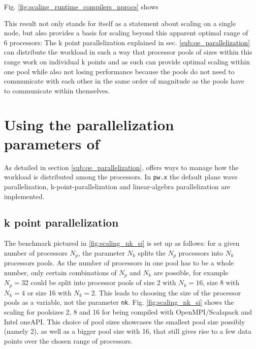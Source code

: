 \documentclass[main.tex]{subfiles}
\begin{document}

Fig. \ref{fig:scaling_runtime_compilers_nprocs} shows 



This result not only stands for itself as a statement about scaling on a single node, but also provides a basis for scaling beyond this apparent optimal range of 6 processors:
The k point parallelization explained in sec. \ref{sub:qe_parallelization} can distribute the workload in such a way that processor pools of sizes within this range work on individual k points and as such can provide optimal scaling within one pool while also not losing performance because the pools do not need to communicate with each other in the same order of magnitude as the pools have to communicate within themselves.


\section{Using the parallelization parameters of \QE}

As detailed in section \ref{sub:qe_parallelization}, \QE offers ways to manage how the workload is distributed among the processors.
In \texttt{pw.x} the default plane wave parallelization, k-point-parallelization and linear-algebra parallelization are implemented.

\subsection{k point parallelization}

The benchmark pictured in \ref{fig:scaling_nk_si} is set up as follows: for a given number of processors \(N_p\), the parameter \(N_k\) splits the \(N_p\) processors into \(N_k\) processors pools.
As the number of processors in one pool has to be a whole number, only certain combinations of \(N_p\) and \(N_k\) are possible, for example \(N_p = 32\) could be split into processor pools of size 2 with \(N_k = 16\), size 8 with \(N_k = 4\) or size 16 with \(N_k = 2\).
This leads to choosing the size of the processor pools as a variable, not the parameter \texttt{nk}.
Fig. \ref{fig:scaling_nk_si} shows the scaling for poolsizes 2, 8 and 16 for \QE being compiled with OpenMPI/Scalapack and Intel oneAPI.
This choice of pool sizes showcases the smallest pool size possibly (namely 2), as well as a bigger pool size with 16, that still gives rise to a few data points over the chosen range of processors.
\end{document}
